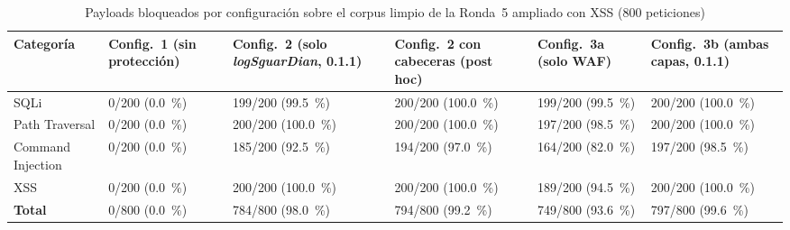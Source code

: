 \begin{table}[H]
\centering
\small
\setlength{\tabcolsep}{4pt}
\begin{tabular}{|L{2.2cm}|L{1.7cm}|L{2.1cm}||L{2.2cm}||L{2.2cm}|L{2.2cm}|}
\hline
\textbf{Categoría} & \textbf{Config.~1 (sin protección)} & \textbf{Config.~2 (solo \textit{logSguarDian}, 0.1.1)} & \textbf{Config.~2 con cabeceras (post hoc)} & \textbf{Config.~3a (solo WAF)} & \textbf{Config.~3b (ambas capas, 0.1.1)} \\ \hline
SQLi & 0/200 (0.0~\%) & 199/200 (99.5~\%) & 200/200 (100.0~\%) & 199/200 (99.5~\%) & 200/200 (100.0~\%) \\ \hline
Path Traversal & 0/200 (0.0~\%) & 200/200 (100.0~\%) & 200/200 (100.0~\%) & 197/200 (98.5~\%) & 200/200 (100.0~\%) \\ \hline
Command Injection & 0/200 (0.0~\%) & 185/200 (92.5~\%) & 194/200 (97.0~\%) & 164/200 (82.0~\%) & 197/200 (98.5~\%) \\ \hline
XSS & 0/200 (0.0~\%) & 200/200 (100.0~\%) & 200/200 (100.0~\%) & 189/200 (94.5~\%) & 200/200 (100.0~\%) \\ \hline
\textbf{Total} & 0/800 (0.0~\%) & 784/800 (98.0~\%) & 794/800 (99.2~\%) & 749/800 (93.6~\%) & 797/800 (99.6~\%) \\ \hline
\end{tabular}
\caption[Cuatro configuraciones sobre el corpus limpio de la Ronda 5 con XSS]{Payloads bloqueados por configuración sobre el corpus limpio de la Ronda~5 ampliado con XSS (800 peticiones)}
\label{tab:res-ronda5}
\end{table}
